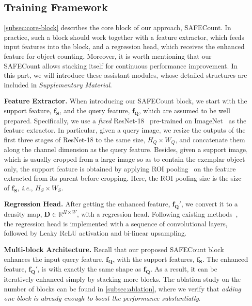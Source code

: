 \documentclass[10pt,twocolumn,letterpaper]{article}
\newcommand{\method}{SAFECount\xspace}
\newcommand{\supp}{\textit{Supplementary Material}\xspace}
\newcommand{\fs}{\bm{f_S}}
\newcommand{\fq}{\bm{f_Q}}
\begin{document}
\subsection{Training Framework}\label{subsec:framework}


\cref{subsec:core-block} describes the core block of our approach, \method.
In practice, such a block should work together with a feature extractor, which feeds input features into the block, and a regression head, which receives the enhanced feature for object counting.
Moreover, it is worth mentioning that our \method allows stacking itself for continuous performance improvement.
In this part, we will introduce these assistant modules, whose detailed structures are included in \supp.


\vspace{2pt}\noindent\textbf{Feature Extractor.}
When introducing our \method block, we start with the support feature, $\fs$, and the query feature, $\fq$, which are assumed to be well prepared.
Specifically, we use a \textit{fixed} ResNet-18~\cite{resnet} pre-trained on ImageNet~\cite{imagenet} as the feature extractor.
In particular, given a query image, we resize the outputs of the first three stages of ResNet-18 to the same size, $H_Q \times W_Q$, and concatenate them along the channel dimension as the query feature.
Besides, given a support image, which is usually cropped from a large image so as to contain the exemplar object only, the support feature is obtained by applying ROI pooling~\cite{faster_rcnn} on the feature extracted from its parent before cropping.
Here, the ROI pooling size is the size of $\fs$, \textit{i.e.}, $H_S \times W_S$.


\vspace{2pt}\noindent\textbf{Regression Head.}
After getting the enhanced feature, $\bm{f_Q'}$, we convert it to a density map, $\bm{D} \in \mathbb{R}^{H \times W}$, with a regression head.
Following existing methods~\cite{gmn, cfocnet, famnet}, the regression head is implemented with a sequence of convolutional layers, followed by Leaky ReLU activation and bi-linear upsampling.


\vspace{2pt}\noindent\textbf{Multi-block Architecture.}
Recall that our proposed \method block enhances the input query feature, $\fq$, with the support features, $\fs$.
The enhanced feature, $\fq'$, is with exactly the same shape as $\fq$.
As a result, it can be iteratively enhanced simply by stacking more blocks.
The ablation study on the number of blocks can be found in \cref{subsec:ablation}, where we verify that \textit{adding one block is already enough to boost the performance substantially}.
\end{document}
